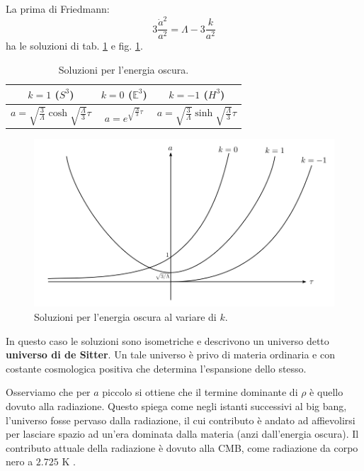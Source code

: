 \begin{itemize}
    La prima di Friedmann:
    \begin{equation*}
        3\frac{\dot{a}^2}{a^2}= \Lambda -3 \frac{k}{a^2}
    \end{equation*}
    ha le soluzioni di tab. \ref{tab.energiaoscura} e fig. \ref{fig.soluzioni_energia}.
    \begin{table}
        \centering
        \begin{tabular}{ccc}
        $k=1$ ($S^3$) & $k=0$ ($\mathbb{E}^3$) & $k=-1$ ($H^3$) \\
        \hline
        $a= \sqrt{\frac{3}{\Lambda}}\cosh \sqrt{\frac{\Lambda}{3}}\tau $     &  $a= e^{ \sqrt{\frac{\Lambda}{3}} \tau}$ &  $a=\sqrt{\frac{3}{\Lambda}}\sinh \sqrt{\frac{\Lambda}{3}}\tau $ \\
        \hline
        \end{tabular}
        \caption{Soluzioni per l'energia oscura.}
        \label{tab.energiaoscura}
    \end{table}
    \begin{figure}
        \centering
        \includegraphics[scale=0.5]{immagini/soluzioni_energia.png}
        \caption{Soluzioni per l'energia oscura al variare di $k$.}
        \label{fig.soluzioni_energia}
    \end{figure}
    In questo caso le soluzioni sono isometriche e descrivono un universo detto \textbf{universo di de Sitter}. Un tale universo è privo di materia ordinaria e con costante cosmologica positiva che determina l'espansione dello stesso.
\end{itemize}

Osserviamo che per $a$ piccolo si ottiene che il termine dominante di $\rho$ è quello dovuto alla radiazione. Questo spiega come negli istanti successivi al big bang, l'universo fosse pervaso dalla radiazione, il cui contributo è andato ad affievolirsi per lasciare spazio ad un'era dominata dalla materia (anzi dall'energia oscura). Il contributo attuale della radiazione è dovuto alla CMB, come radiazione da corpo nero a $2.725$ K .

